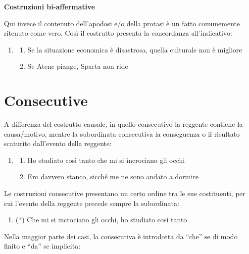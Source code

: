 \documentclass[
  a4paper,
  twoside,
  11pt,
  chapterprefix=false,
  bibliography=totocnumbered,
  listof=flat]{scrbook}
\providecommand{\tightlist}{%
  \setlength{\itemsep}{0pt}\setlength{\parskip}{0pt}}
\begin{document}
\textbf{Costruzioni bi-affermative}

Qui invece il contenuto dell'apodosi e/o della protasi è un fatto comunemente ritenuto come vero. Così il costrutto presenta la concordanza all'indicativo:

\begin{enumerate}
\def\labelenumi{(\arabic{enumi})}
\setcounter{enumi}{90}
\item
  \begin{enumerate}
  \def\labelenumii{\alph{enumii}.}
  \tightlist
  \item
    Se la situazione economica è disastrosa, quella culturale non è migliore
  \item
    Se Atene piange, Sparta non ride
  \end{enumerate}
\end{enumerate}

\hypertarget{consecutive}{%
\section{Consecutive}\label{consecutive}}

A differenza del costrutto causale, in quello consecutivo la reggente contiene la causa/motivo, mentre la subordinata consecutiva la conseguenza o il risultato scaturito dall'evento della reggente:

\begin{enumerate}
\def\labelenumi{(\arabic{enumi})}
\setcounter{enumi}{91}
\item
  \begin{enumerate}
  \def\labelenumii{\alph{enumii}.}
  \tightlist
  \item
    Ho studiato così tanto che mi si incrociano gli occhi
  \item
    Ero davvero stanco, sicché me ne sono andato a dormire
  \end{enumerate}
\end{enumerate}

Le costruzioni consecutive presentano un certo ordine tra le sue costituenti, per cui l'evento della reggente precede sempre la subordinata:

\begin{enumerate}
\def\labelenumi{(\arabic{enumi})}
\setcounter{enumi}{92}
\tightlist
\item
  (*) Che mi si incrociano gli occhi, ho studiato così tanto
\end{enumerate}

Nella maggior parte dei casi, la consecutiva è introdotta da \enquote{che} se di modo finito e \enquote{da} se implicita:
\end{document}
